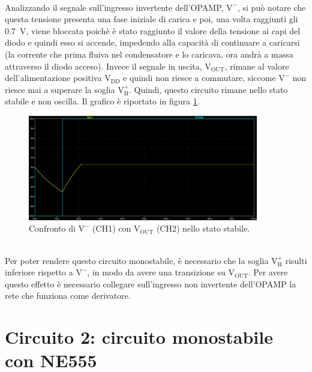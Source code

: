 \documentclass{report}
\begin{document}
\\Analizzando il segnale sull'ingresso invertente dell'OPAMP, $\mathrm{V^-}$, si può notare che questa tensione presenta una fase iniziale di carica e poi, una volta raggiunti gli \SI{0.7}{\volt}, viene bloccata poichè è stato raggiunto il valore della tensione ai capi del diodo e quindi esso si accende, impedendo alla capacità di continuare a caricarsi (la corrente che prima fluiva nel condensatore e lo caricava, ora andrà a massa attraverso il diodo acceso). Invece il segnale in uscita, $\mathrm{V_{OUT}}$, rimane al valore dell'alimentazione positiva $\mathrm{V_{DD}}$ e quindi non riesce a commutare, siccome $\mathrm{V^-}$ non riesce mai a superare la soglia $\mathrm{V_H^+}$. Quindi, questo circuito rimane nello stato stabile e  non oscilla. Il grafico è riportato in figura \ref{figura:simulazione1}. 
\begin{figure}[h!]
	\centering
	\includegraphics[height=4.6cm]{immagini/plot_sim_stabile}
	\caption{Confronto di $\mathrm{V^-}$ (CH1) con $\mathrm{V_{OUT}}$ (CH2) nello stato stabile.}
	\label{figura:simulazione1}
\end{figure}
\\Per poter rendere questo circuito monostabile, è necessario che la soglia $\mathrm{V_H^+}$ risulti inferiore rispetto a $\mathrm{V^-}$, in modo da avere una transizione su $\mathrm{V_{OUT}}$. Per avere questo effetto è necessario collegare sull'ingresso non invertente dell'OPAMP la rete che funziona come derivatore.

\newpage
\section{Circuito 2: circuito monostabile con NE555}
\end{document}
